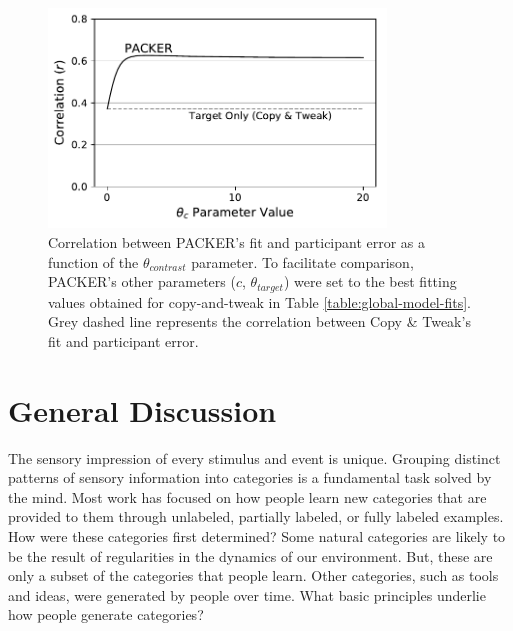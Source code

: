 \documentclass[12pt]{article}
\begin{document}
\begin{flushleft}
\begin{figure}
    \begin{center}
    \includegraphics[width=0.8\textwidth]{figs/packer-corr.pdf}
    \caption{Correlation between PACKER's fit and participant error as a
function of the $\theta_{contrast}$ parameter. To facilitate comparison,
PACKER's other parameters ($c$, $\theta_{target}$) were set to the best fitting
values obtained for copy-and-tweak in Table \ref{table:global-model-fits}. Grey
dashed line represents the correlation between Copy \& Tweak's fit and
participant error.}
    \label{fig:packer-corr}
    \end{center}
\end{figure}

\section{General Discussion}
The sensory impression of every stimulus and event is unique. Grouping distinct patterns of sensory information into categories is a fundamental task solved by the mind. Most work has focused on how people learn new categories that are provided to them through unlabeled, partially labeled, or fully labeled examples. How were these categories first determined? Some natural categories are likely to be the result of regularities in the dynamics of our environment. But, these are only a subset of the categories that people learn. Other categories, such as tools and ideas, were generated by people over time. What basic principles underlie how people generate categories?


\end{flushleft}
\end{document}
